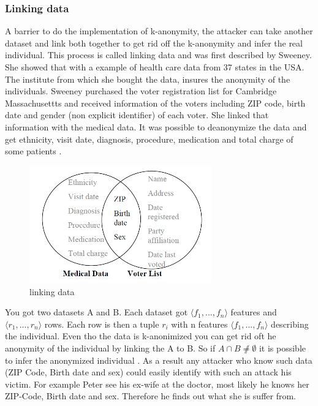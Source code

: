 \documentclass{llncs}
\begin{document}
\subsubsection{Linking data}
A barrier to do the implementation of k-anonymity, the attacker can take another dataset and link both together to get rid off the k-anonymity and infer the real individual. This process is called linking data and was first described by Sweeney\cite{sweeney2002k}. She showed that with a example of health care data from 37 states in the USA. The institute from which she bought the data, insures the anonymity of the individuals. Sweeney purchased the voter registration list for Cambridge Massachusettts and received information of the voters including ZIP code, birth date and gender (non explicit identifier) of each voter. She linked that information with the medical data. It was possible to deanonymize the data  and get ethnicity, visit date, diagnosis, procedure, medication and total charge of some patients \cite{sweeney2002k}. 

\begin{figure}[]
	\centering
	\includegraphics[width=0.7\textwidth]{linkingdata.png}
	\caption{linking data}%
	\label{quasiidentifier}
\end{figure}
You got two datasets A and B. Each dataset got \ensuremath{\langle f_1, ... ,f_n \rangle} features and \ensuremath{\langle r_1, ... ,r_n \rangle} rows.
Each row is then a tuple \ensuremath{r_i} with n features \ensuremath{\langle f_1, ... ,f_n \rangle} describing the individual.
Even tho the data is k-anonimized you can get rid oft he anonymity of the individual by linking the A to B. So if \ensuremath{A \cap B \not \neq \emptyset} it is possible to infer the anonymized individual \cite{sweeney2002k}.
As a result any attacker who know such data (ZIP Code, Birth date and sex) could easily identify with such an attack his victim. For example Peter see his ex-wife at the doctor, most likely he knows her ZIP-Code, Birth date and sex. Therefore he finds out what she is suffer from. 
\end{document}
